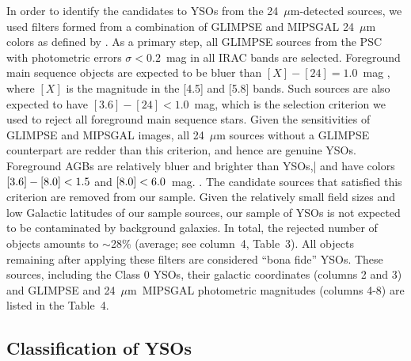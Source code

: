\documentclass[iop]{emulateapj}
\newcommand{\mipslam}{24~$\mu$m}
\begin{document}
In order to identify the candidates to YSOs from the 24~$\mu$m-detected 
sources, we used filters formed from a combination of GLIMPSE and MIPSGAL 
24~$\mu$m colors as defined by \citet{gutermuth+09}.
As a primary step, all GLIMPSE sources from the PSC with photometric errors
$\sigma<0.2$~mag in all IRAC bands are selected.
Foreground main sequence objects are expected to be bluer than
$[X]-[24]=1.0$~mag \citep{gutermuth+09}, where $[X]$ is the magnitude in the 
[4.5] and [5.8] bands. Such sources are also expected to have $[3.6]-[24]<1.0$~mag,
which is the selection criterion we used to reject all foreground main sequence stars.
%
Given the sensitivities of 
GLIMPSE and MIPSGAL images, all 24~$\mu$m sources without
a GLIMPSE counterpart are redder than this criterion, and hence are genuine
YSOs. Foreground AGBs are relatively bluer and brighter than YSOs,| and have colors
$\rm [3.6]-[8.0]<1.5$ and $\rm [8.0]<6.0$~mag. \citep{marengo+08}. 
The candidate sources that satisfied this criterion are removed from our
sample. Given the relatively small field sizes and low Galactic latitudes of our
sample sources, our sample of YSOs is not expected to be contaminated
by background galaxies. In total, the rejected number of objects amounts
to $\sim$28\% (average; see column~4, Table~3). All objects remaining after applying these
filters are considered ``bona fide'' YSOs. 
These sources, including the Class 0 YSOs, their galactic 
coordinates (columns 2 and 3) and GLIMPSE and \mipslam~MIPSGAL 
photometric magnitudes (columns 4-8) are listed in the Table~4.

\subsection{Classification of YSOs}
\end{document}
